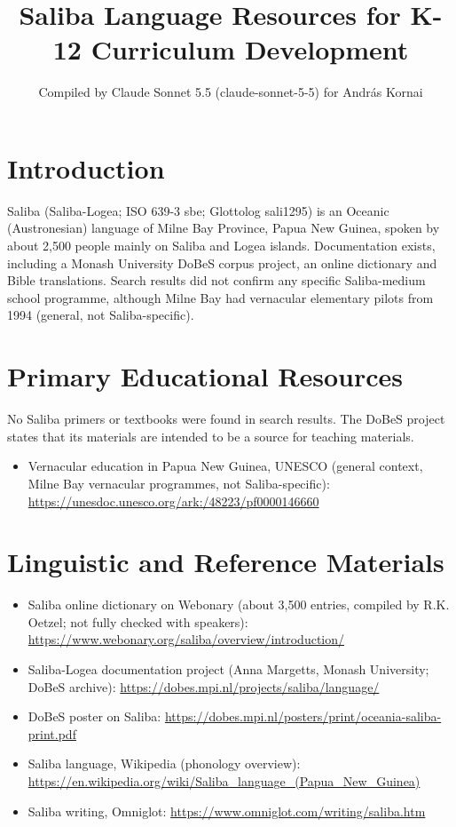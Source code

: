 \documentclass[12pt]{article}
\title{Saliba Language Resources for K-12 Curriculum Development}
\author{Compiled by Claude Sonnet 5.5 (claude-sonnet-5-5) for Andr\'as Kornai}
\date{}
\begin{document}
\maketitle

\section{Introduction}
Saliba (Saliba-Logea; ISO 639-3 sbe; Glottolog sali1295) is an Oceanic (Austronesian) language of Milne Bay Province, Papua New Guinea, spoken by about 2,500 people mainly on Saliba and Logea islands. Documentation exists, including a Monash University DoBeS corpus project, an online dictionary and Bible translations. Search results did not confirm any specific Saliba-medium school programme, although Milne Bay had vernacular elementary pilots from 1994 (general, not Saliba-specific).

\section{Primary Educational Resources}
No Saliba primers or textbooks were found in search results. The DoBeS project states that its materials are intended to be a source for teaching materials.
\begin{itemize}
\item Vernacular education in Papua New Guinea, UNESCO (general context, Milne Bay vernacular programmes, not Saliba-specific): \url{https://unesdoc.unesco.org/ark:/48223/pf0000146660}
\end{itemize}

\section{Linguistic and Reference Materials}
\begin{itemize}
\item Saliba online dictionary on Webonary (about 3,500 entries, compiled by R.K. Oetzel; not fully checked with speakers): \url{https://www.webonary.org/saliba/overview/introduction/}
\item Saliba-Logea documentation project (Anna Margetts, Monash University; DoBeS archive): \url{https://dobes.mpi.nl/projects/saliba/language/}
\item DoBeS poster on Saliba: \url{https://dobes.mpi.nl/posters/print/oceania-saliba-print.pdf}
\item Saliba language, Wikipedia (phonology overview): \url{https://en.wikipedia.org/wiki/Saliba_language_(Papua_New_Guinea)}
\item Saliba writing, Omniglot: \url{https://www.omniglot.com/writing/saliba.htm}
\end{itemize}
\end{document}
